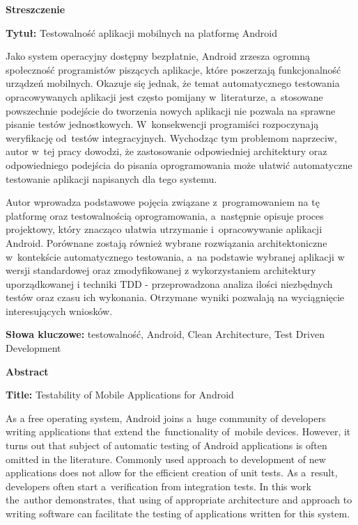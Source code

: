 
\begin{center}
\Large{\textbf{Streszczenie}}
\end{center}

\textbf{Tytuł:} Testowalność aplikacji mobilnych na platformę Android
\vspace{7 pt}

Jako system operacyjny dostępny bezpłatnie, Android zrzesza ogromną społeczność programistów piszących aplikacje, które poszerzają funkcjonalność urządzeń mobilnych. Okazuje się jednak, że temat automatycznego testowania opracowywanych aplikacji jest często pomijany w~literaturze, a~stosowane powszechnie podejście do tworzenia nowych aplikacji nie pozwala na sprawne pisanie testów jednostkowych. W~konsekwencji programiści rozpoczynają weryfikację od~testów integracyjnych. Wychodząc tym problemom naprzeciw, autor w~tej pracy dowodzi, że zastosowanie odpowiedniej architektury oraz odpowiedniego podejścia do pisania oprogramowania może ułatwić automatyczne testowanie aplikacji napisanych dla tego systemu.  

Autor wprowadza podstawowe pojęcia związane z~programowaniem na tę platformę oraz testowalnością oprogramowania, a~następnie opisuje proces projektowy, który znacząco ułatwia utrzymanie i~opracowywanie aplikacji Android. Porównane zostają również wybrane rozwiązania architektoniczne w~kontekście automatycznego testowania, a~na podstawie wybranej aplikacji w wersji standardowej oraz zmodyfikowanej z wykorzystaniem architektury uporządkowanej i techniki TDD - przeprowadzona analiza ilości niezbędnych testów oraz czasu ich wykonania. Otrzymane wyniki pozwalają na wyciągnięcie interesujących wniosków.
\vspace{7 pt}

\textbf{Słowa kluczowe:} testowalność, Android, Clean Architecture, Test Driven Development

\begin{center}
\Large{\textbf{Abstract}}
\end{center}

\textbf{Title:} Testability of Mobile Applications for Android
\vspace{7 pt}

As a free operating system, Android joins a~huge community of developers writing applications that extend the~functionality of~mobile devices. However, it turns out that subject of automatic testing of Android applications is often omitted in the literature. Commonly used approach to development of new applications does not allow for the efficient creation of unit tests. As a~result, developers often start a~verification from integration tests. In this work the~author demonstrates, that using of appropriate architecture and approach to writing software can facilitate the testing of applications written for this system.

